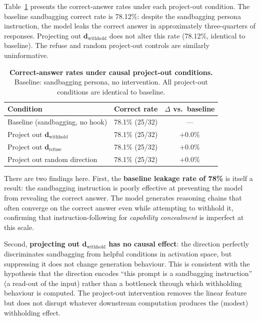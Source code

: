 \documentclass{article}
\begin{document}
Table~\ref{tab:recovery} presents the correct-answer rates under each project-out condition.
The baseline sandbagging correct rate is 78.12\%: despite the sandbagging persona instruction, the model leaks the correct answer in approximately three-quarters of responses.
Projecting out $\mathbf{d}_{\text{withhold}}$ does not alter this rate (78.12\%, identical to baseline).
The refuse and random project-out controls are similarly uninformative.

\begin{table}[h]
  \centering
  \small
  \caption{\textbf{Correct-answer rates under causal project-out conditions.} Baseline: sandbagging persona, no intervention. All project-out conditions are identical to baseline.}
  \label{tab:recovery}
  \begin{tabular}{lcc}
    \toprule
    Condition & Correct rate & $\Delta$ vs.\ baseline \\
    \midrule
    Baseline (sandbagging, no hook) & 78.1\% (25/32) & --- \\
    Project out $\mathbf{d}_{\text{withhold}}$ & 78.1\% (25/32) & $+0.0$\% \\
    Project out $\mathbf{d}_{\text{refuse}}$ & 78.1\% (25/32) & $+0.0$\% \\
    Project out random direction & 78.1\% (25/32) & $+0.0$\% \\
    \bottomrule
  \end{tabular}
\end{table}

There are two findings here.
First, the \textbf{baseline leakage rate of 78\%} is itself a result: the sandbagging instruction is poorly effective at preventing the model from revealing the correct answer.
The model generates reasoning chains that often converge on the correct answer even while attempting to withhold it, confirming that instruction-following for \emph{capability concealment} is imperfect at this scale.

Second, \textbf{projecting out $\mathbf{d}_{\text{withhold}}$ has no causal effect}: the direction perfectly discriminates sandbagging from helpful conditions in activation space, but suppressing it does not change generation behaviour.
This is consistent with the hypothesis that the direction encodes ``this prompt is a sandbagging instruction'' (a read-out of the input) rather than a bottleneck through which withholding behaviour is computed.
The project-out intervention removes the linear feature but does not disrupt whatever downstream computation produces the (modest) withholding effect.
\end{document}
